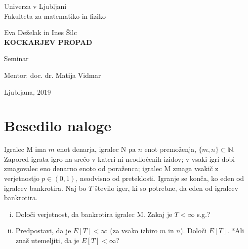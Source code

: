 \documentclass[12pt, a4paper]{article}
\begin{document}
\begin{titlepage}
\begin{center}

\large
Univerza v Ljubljani\\
\normalsize
Fakulteta za matematiko in fiziko\\

\vspace{3 cm} 

\large
Eva Deželak in Ines Šilc\\

\vspace{0.5cm}
\LARGE
\textbf{KOCKARJEV PROPAD}

\vspace{0.5 cm}
\normalsize
Seminar

\vspace{1.5cm}
\normalsize
Mentor: doc. dr. Matija Vidmar

\vspace{3cm}


\vfill

\large Ljubljana, 2019

\end{center}
\end{titlepage}

\newpage

\tableofcontents
\vspace{20mm}
\newpage
 \section[Besedilo naloge]{Besedilo naloge}



Igralec M ima $m$ enot denarja, igralec N pa $n$ enot premoženja, $\{m,n\}\subset \mathbb{N}$. Zapored igrata igro na srečo v kateri ni neodločenih izidov; v vsaki igri dobi zmagovalec eno denarno enoto od poraženca; igralec M zmaga vsakič z verjetnostjo $p\in (0,1)$, neodvisno od preteklosti. Igranje se konča, ko eden od igralcev bankrotira. Naj bo $T$ število iger, ki so potrebne, da eden od igralcev bankrotira. 
\begin{enumerate}[(i)]
\item Določi verjetnost, da bankrotira igralec M. Zakaj je  $T<\infty$ s.g.?
\item Predpostavi, da je $E[T]<\infty$ (za vsako izbiro $m$ in $n$). Določi $E[T]$. *Ali znaš utemeljiti, da je $E[T]<\infty$?
\end{enumerate}
\end{document}
